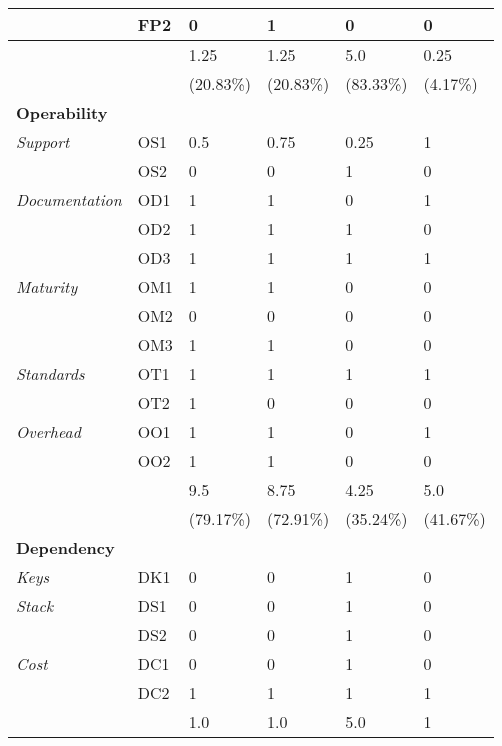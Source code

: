 \begin{longtable}{@{\extracolsep{\fill}}llllll@{}}
                               & FP2 & 0 & 1 & 0 & 0 \\
                               \hline
                               && 1.25 & 1.25 & 5.0 & 0.25 \\
                               && (20.83\%) & (20.83\%) & (83.33\%) & (4.17\%) \\
                               \midrule
        \textbf{Operability} &&&&&\\
        \textit{Support}       & OS1 & 0.5 & 0.75 & 0.25 & 1 \\
                               & OS2 & 0 & 0 & 1 & 0 \\
        \textit{Documentation} & OD1 & 1 & 1 & 0 & 1 \\
                               & OD2 & 1 & 1 & 1 & 0 \\
                               & OD3 & 1 & 1 & 1 & 1 \\
        \textit{Maturity}      & OM1 & 1 & 1 & 0 & 0 \\
                               & OM2 & 0 & 0 & 0 & 0 \\
                               & OM3 & 1 & 1 & 0 & 0 \\
        \textit{Standards}     & OT1 & 1 & 1 & 1 & 1 \\
                               & OT2 & 1 & 0 & 0 & 0 \\
        \textit{Overhead}      & OO1 & 1 & 1 & 0 & 1 \\
                               & OO2 & 1 & 1 & 0 & 0 \\
                               \hline
                               && 9.5 & 8.75 & 4.25 & 5.0 \\
                               && (79.17\%) & (72.91\%) & (35.24\%) & (41.67\%) \\
                               \midrule
        \textbf{Dependency} &&&&&\\
        \textit{Keys}          & DK1 & 0 & 0 & 1 & 0 \\
        \textit{Stack}         & DS1 & 0 & 0 & 1 & 0 \\
                               & DS2 & 0 & 0 & 1 & 0 \\                       
        \textit{Cost}          & DC1 & 0 & 0 & 1 & 0 \\
                               & DC2 & 1 & 1 & 1 & 1 \\     
                               \hline
                               && 1.0 & 1.0 & 5.0 & 1 \\

\end{longtable}
